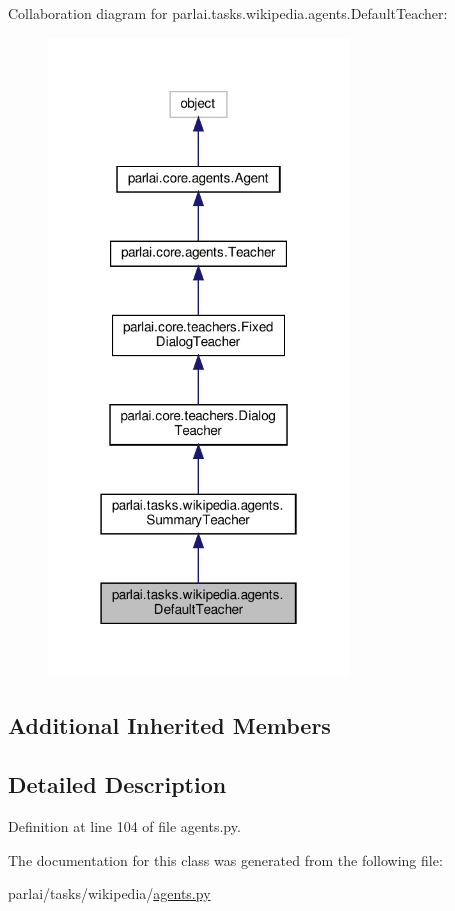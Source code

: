 Collaboration diagram for parlai.\+tasks.\+wikipedia.\+agents.\+Default\+Teacher\+:
\nopagebreak
\begin{figure}[H]
\begin{center}
\leavevmode
\includegraphics[width=226pt]{classparlai_1_1tasks_1_1wikipedia_1_1agents_1_1DefaultTeacher__coll__graph}
\end{center}
\end{figure}
\subsection*{Additional Inherited Members}


\subsection{Detailed Description}


Definition at line 104 of file agents.\+py.



The documentation for this class was generated from the following file\+:\begin{DoxyCompactItemize}
\item 
parlai/tasks/wikipedia/\hyperlink{parlai_2tasks_2wikipedia_2agents_8py}{agents.\+py}\end{DoxyCompactItemize}
